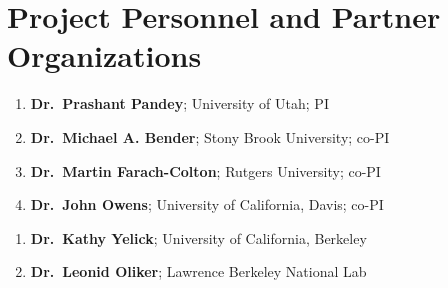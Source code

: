 
\section*{Project Personnel and Partner Organizations}
\vspace{0.1in}
\noindent
\begin{enumerate}
\item \textbf{Dr.\ Prashant Pandey}; University of Utah; PI
\item \textbf{Dr.\ Michael A. Bender}; Stony Brook University; co-PI
\item \textbf{Dr.\ Martin Farach-Colton}; Rutgers University; co-PI
\item \textbf{Dr.\ John Owens}; University of California, Davis; co-PI
\end{enumerate}
\vspace{3mm}
\begin{enumerate}
\item \textbf{Dr.\ Kathy Yelick}; University of California, Berkeley
\item \textbf{Dr.\ Leonid Oliker}; Lawrence Berkeley National Lab
\end{enumerate}
